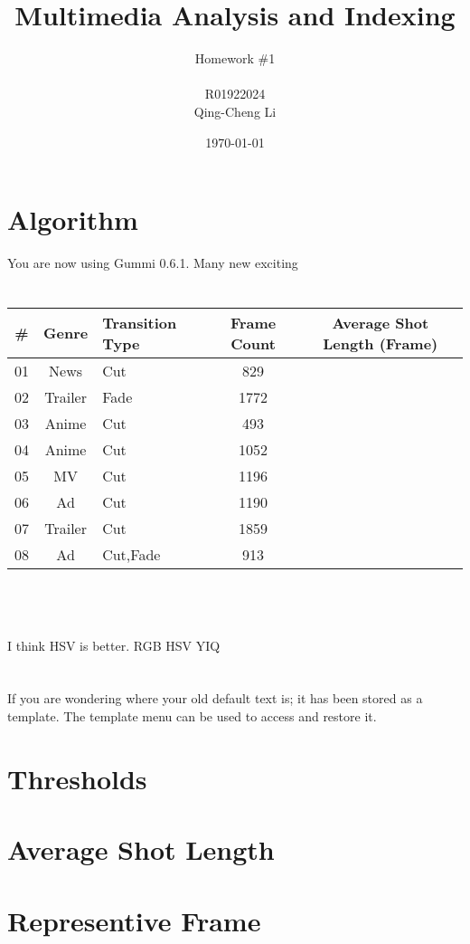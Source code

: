 \documentclass[11pt]{article}
\title{\textbf{Multimedia Analysis and Indexing}}
\author{Homework \#1\\
		\\
		R01922024\\
		Qing-Cheng Li}
\date{\today}
\begin{document}
\maketitle

\section{Algorithm}

You are now using Gummi 0.6.1. Many new exciting 

\section{}

\begin{tabular}{c|c|l|c||c}
	\# & Genre & Transition Type & Frame Count & Average Shot Length (Frame)\\
\hline
\hline
	01 & News & Cut & 829 & \\
\hline
	02 & Trailer & Fade & 1772 & \\
\hline
	03 & Anime & Cut & 493 & \\
\hline
	04 & Anime & Cut & 1052 & \\
\hline
	05 & MV & Cut & 1196 & \\
\hline
	06 & Ad & Cut & 1190 & \\
\hline
	07 & Trailer & Cut & 1859 & \\
\hline
	08 & Ad & Cut,Fade & 913 & \\
\end{tabular}
\\
\\
\\
I think HSV is better. 
RGB
HSV
YIQ

\section{}
If you are wondering where your old default text is; it has been stored as a template. The template menu can be used to access and restore it. 

\section{Thresholds}

\section{Average Shot Length}

\section{Representive Frame}
\end{document}
